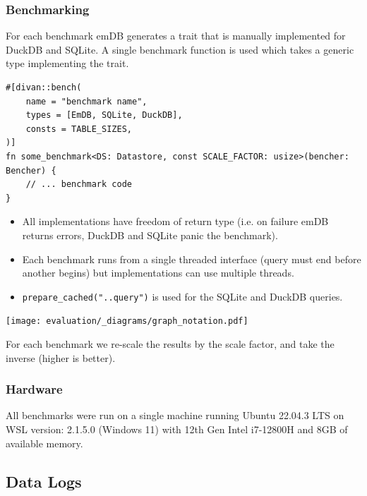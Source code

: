 \subsubsection{Benchmarking}
For each benchmark emDB generates a trait that is manually implemented for DuckDB and SQLite. A single benchmark function is used which takes a generic type implementing the trait.
\begin{verbatim}
#[divan::bench(
    name = "benchmark name",
    types = [EmDB, SQLite, DuckDB],
    consts = TABLE_SIZES,
)]
fn some_benchmark<DS: Datastore, const SCALE_FACTOR: usize>(bencher: Bencher) {
    // ... benchmark code
}
\end{verbatim}
\noindent
\begin{itemize}
    \setlength\itemsep{0em}
    \item All implementations have freedom of return type (i.e. on failure emDB returns errors, DuckDB and SQLite panic the benchmark).
    \item Each benchmark runs from a single threaded interface (query must end before another begins) but implementations can use multiple threads.
    \item \texttt{prepare_cached("..query")} is used for the SQLite and DuckDB queries.
\end{itemize}
\noindent
\begin{minipage}{.24\textwidth}
    \texttt{[image: evaluation/\_diagrams/graph\_notation.pdf]}
\end{minipage}\hfill\begin{minipage}{.76\textwidth}
    For each benchmark we re-scale the results by the scale factor, and take the inverse (higher is better).
\end{minipage}

\subsubsection{Hardware}
All benchmarks were run on a single machine running Ubuntu 22.04.3 LTS on WSL version: 2.1.5.0 (Windows 11) with 12th Gen Intel i7-12800H and 8GB of available memory.

\subsection{Data Logs}
